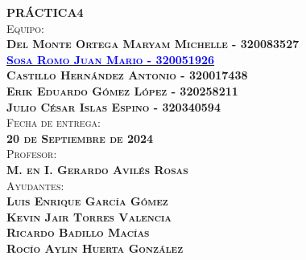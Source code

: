 \begin{titlepage}
\begin{minipage}[c][0.81\textheight][t]{0.75\textwidth}
\begin{center}
			\textsc{\LARGE \textbf{P}\hspace{1cm}\textbf{R}\hspace{1cm}\textbf{Á}\hspace{1cm}\textbf{C}\hspace{1cm}\textbf{T}\hspace{1cm}\textbf{I}\hspace{1cm}\textbf{C}\hspace{1cm}\textbf{A}\hspace{1.3cm}\textbf{4}}\\[2cm]
			\textsc{\Large{Equipo:}\normalsize \\
                \vspace{.3cm}
				\textbf{Del Monte Ortega Maryam Michelle - 320083527 \\
                \vspace{.2cm}
				\href{https://github.com/JuanSosaCiencias}{\textcolor{blue}{Sosa Romo Juan Mario - 320051926}} \\
                \vspace{.2cm}
				Castillo Hernández Antonio - 320017438 \\
                \vspace{.2cm}
                Erik Eduardo Gómez López - 320258211 \\
                \vspace{.2cm}
                Julio César Islas Espino - 320340594}}\\[0.5cm]     
			
			\textsc{{Fecha de entrega: \\ \textbf{20 de Septiembre de 2024}}}\\[0.5cm]        
			
			\textsc{{Profesor: \\ \textbf{M. en I. Gerardo Avilés Rosas}}}\\[0.5cm]  
			
			\textsc{Ayudantes: \\ \textbf{Luis Enrique García Gómez \\ Kevin Jair Torres Valencia \\ Ricardo Badillo Macías \\ Rocío Aylin Huerta González
			} }
			
			
			\vspace{0.5cm}
		\end{center}
	\end{minipage}
\end{titlepage}
